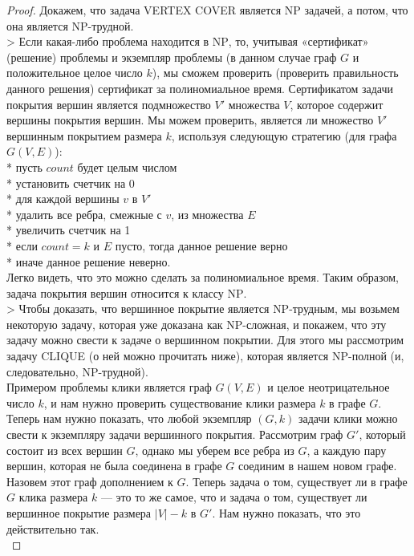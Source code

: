     \begin{proof}
        Докажем, что задача \textsc{VERTEX COVER} является \textsc{NP} задачей, а потом, что она является \textsc{NP}-трудной.\\
        > Если какая-либо проблема находится в \textsc{NP}, то, учитывая «сертификат» (решение) проблемы и экземпляр проблемы (в данном случае граф $G$ и положительное целое число $k$), мы сможем проверить (проверить правильность данного решения) сертификат за полиномиальное время.
        Сертификатом задачи покрытия вершин является подмножество $V'$ множества $V$, которое содержит вершины покрытия вершин. Мы можем проверить, является ли множество $V'$ вершинным покрытием размера $k$, используя следующую стратегию (для графа $G(V, E)$):\\
        * пусть $count$ будет целым числом\\
        * установить счетчик на 0\\
        * для каждой вершины $v$ в $V'$\\
        * удалить все ребра, смежные с $v$, из множества $E$\\
        * увеличить счетчик на 1\\
        * если $count = k$ и $E$ пусто, тогда данное решение верно\\
        * иначе данное решение неверно.\\
        Легко видеть, что это можно сделать за полиномиальное время. Таким образом, задача покрытия вершин относится к классу \textsc{NP}.\\
        > Чтобы доказать, что вершинное покрытие является \textsc{NP}-трудным, мы возьмем некоторую задачу, которая уже доказана как \textsc{NP}-сложная, и покажем, что эту задачу можно свести к задаче о вершинном покрытии. Для этого мы рассмотрим задачу \textsc{CLIQUE} (о ней можно прочитать ниже), которая является \textsc{NP}-полной (и, следовательно, \textsc{NP}-трудной).\\
        Примером проблемы клики является граф $G(V, E)$ и целое неотрицательное число $k$, и нам нужно проверить существование клики размера $k$ в графе $G$.\\
        Теперь нам нужно показать, что любой экземпляр $(G, k)$ задачи клики можно свести к экземпляру задачи вершинного покрытия. Рассмотрим граф $G'$, который состоит из всех вершин $G$, однако мы уберем все ребра из $G$, а каждую пару вершин, которая не была соединена в графе $G$ соединим в нашем новом графе. Назовем этот граф дополнением к $G$. Теперь задача о том, существует ли в графе $G$ клика размера $k$ --- это то же самое, что и задача о том, существует ли вершинное покрытие размера $|V| - k$ в $G'$. Нам нужно показать, что это действительно так.\\

\end{proof}
